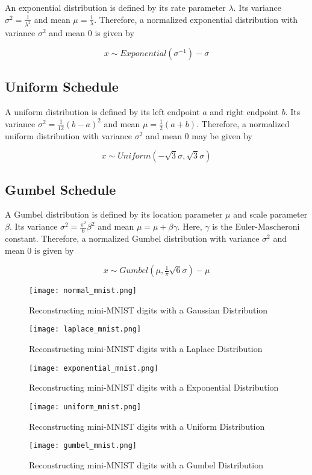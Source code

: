 \documentclass[10pt,twocolumn,letterpaper]{article}
\begin{document}
An exponential distribution is defined by its rate parameter $\lambda$. Its variance $\sigma^2 = \frac{1}{\lambda^2}$ and mean $\mu = \frac{1}{\lambda}$. Therefore, a normalized exponential distribution with variance $\sigma^2$ and mean 0 is given by


\begin{equation}x \sim \textit{Exponential}(\sigma^{-1}) - \sigma
\end{equation}

\subsection{Uniform Schedule}

A uniform distribution is defined by its left endpoint $a$ and right endpoint $b$. Its variance $\sigma^2 = \frac{1}{12}(b-a)^2$ and mean $\mu = \frac{1}{2}(a+b)$. Therefore, a normalized uniform distribution with variance $\sigma^2$ and mean 0 may be given by


\begin{equation}x \sim \textit{Uniform}(-\sqrt{3}\sigma, \sqrt{3}\sigma)
\end{equation}

\subsection{Gumbel Schedule}

A Gumbel distribution is defined by its location parameter $\mu$ and scale parameter $\beta$. Its variance  $\sigma^2 = \frac{\pi^2}{6}\beta^2$ and mean $\mu =  \mu +\beta \gamma $. Here, $\gamma$ is the Euler-Mascheroni constant. Therefore, a normalized Gumbel distribution with variance $\sigma^2$ and mean 0 is given by


\begin{equation}x \sim \textit{Gumbel}(\mu, \tfrac{1}{\pi}\sqrt{6}\sigma) - \mu
\end{equation}
\begin{figure*}
  \centering
  \texttt{[image: normal\_mnist.png]}
  \caption{Reconstructing mini-MNIST digits with a Gaussian Distribution}
  \hfill
\end{figure*}
\begin{figure*}
  \centering
  \texttt{[image: laplace\_mnist.png]}
  \caption{Reconstructing mini-MNIST digits with a Laplace Distribution}
  \hfill
\end{figure*}
\begin{figure*}
  \centering
  \texttt{[image: exponential\_mnist.png]}
  \caption{Reconstructing mini-MNIST digits with a Exponential Distribution}
  \hfill
\end{figure*}
\begin{figure*}
  \centering
  \texttt{[image: uniform\_mnist.png]}
  \caption{Reconstructing mini-MNIST digits with a Uniform Distribution}
  \hfill
\end{figure*}
\begin{figure*}
  \centering
  \texttt{[image: gumbel\_mnist.png]}
  \caption{Reconstructing mini-MNIST digits with a Gumbel Distribution}
  \hfill
\end{figure*}
\end{document}

